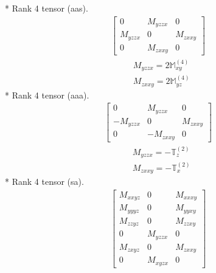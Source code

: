 \documentclass[fleqn,8pt,landscape]{jsarticle}
\begin{document}
* Rank 4 tensor (aas).
\begin{align*}
\begin{bmatrix} 0 & M_{yzzx} & 0 \\ M_{yzzx} & 0 & M_{zxxy} \\ 0 & M_{zxxy} & 0 \end{bmatrix}
\end{align*}
\begin{align*}
& M_{yzzx} = 2 \mathbb{M}_{xy}^{(4)} \\
& M_{zxxy} = 2 \mathbb{M}_{yz}^{(4)}
\end{align*}
* Rank 4 tensor (aaa).
\begin{align*}
\begin{bmatrix} 0 & M_{yzzx} & 0 \\ - M_{yzzx} & 0 & M_{zxxy} \\ 0 & - M_{zxxy} & 0 \end{bmatrix}
\end{align*}
\begin{align*}
& M_{yzzx} = - \mathbb{T}_{z}^{(2)} \\
& M_{zxxy} = - \mathbb{T}_{x}^{(2)}
\end{align*}
* Rank 4 tensor (sa).
\begin{align*}
\begin{bmatrix} M_{xxyz} & 0 & M_{xxxy} \\ M_{yyyz} & 0 & M_{yyxy} \\ M_{zzyz} & 0 & M_{zzxy} \\ 0 & M_{yzzx} & 0 \\ M_{zxyz} & 0 & M_{zxxy} \\ 0 & M_{xyzx} & 0 \end{bmatrix}
\end{align*}
\end{document}
